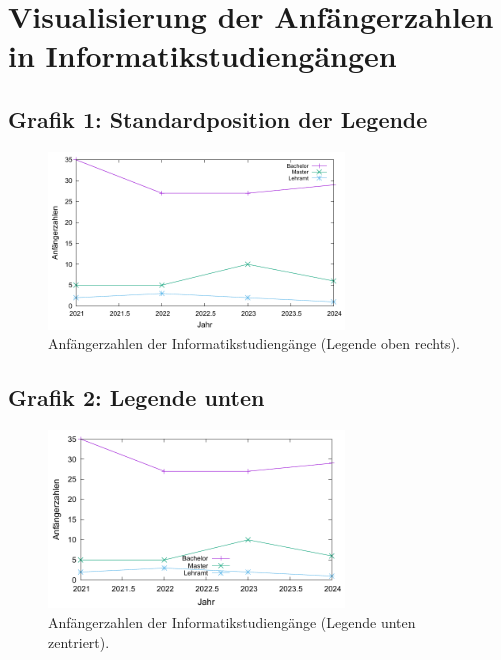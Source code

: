 \documentclass[a4paper,12pt]{article}
\begin{document}
\section*{Visualisierung der Anfängerzahlen in Informatikstudiengängen}

\subsection*{Grafik 1: Standardposition der Legende}
\begin{figure}[h!]
    \centering
    \includegraphics[width=0.7\textwidth]{plot1.pdf} %
    \caption{Anfängerzahlen der Informatikstudiengänge (Legende oben rechts).}
\end{figure}

\subsection*{Grafik 2: Legende unten}
\begin{figure}[h!]
    \centering
    \includegraphics[width=0.7\textwidth]{plot2.pdf} %
    \caption{Anfängerzahlen der Informatikstudiengänge (Legende unten zentriert).}
\end{figure}

\clearpage

\end{document}

